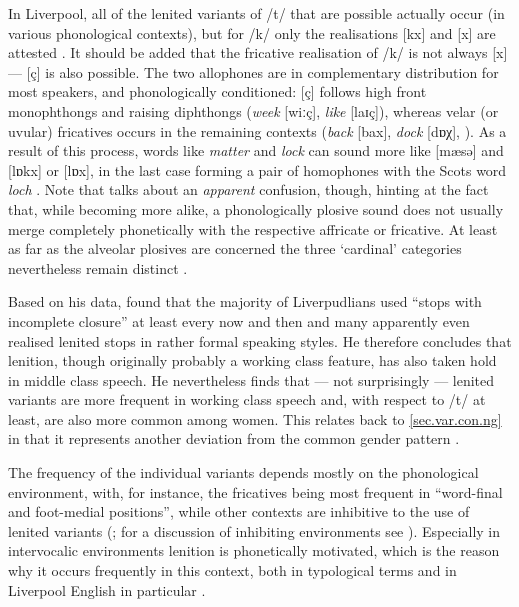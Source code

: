 In Liverpool, all of the lenited variants of /t/ that are possible actually occur (in various phonological contexts), but for /k/ only the realisations [kx] and [x] are attested \parencite[cf][242]{honeybone2001}.
It should be added that the fricative realisation of /k/ is not always [x] --- [ç] is also possible.
The two allophones are in complementary distribution for most speakers, and phonologically conditioned: [ç] follows high front monophthongs and raising diphthongs (\emph{week} [wiːç], \emph{like} [laɪç]), whereas velar (or uvular) fricatives occurs in the remaining contexts (\emph{back} [bax], \emph{dock} [dɒχ], \citealp[cf.][353]{watson2007}).
As a result of this process, words like \emph{matter} and \emph{lock} can sound more like [mæsə] and [lɒkx] or [lɒx], in the last case forming a pair of homophones with the Scots word \emph{loch} \citep[cf.][73]{trudgill1999}.
Note that \citeauthor{knowles1973} talks about an \emph{apparent} confusion, though, hinting at the fact that, while becoming more alike, a phonologically plosive sound does not usually merge completely phonetically with the respective affricate or fricative.
At least as far as the alveolar plosives are concerned the three `cardinal' categories nevertheless remain distinct \parencite[cf.][327 and 252--253]{knowles1973}.

Based on his \citeyear{knowles1973} data, \citeauthor{knowles1973} found that the majority of Liverpudlians used ``stops with incomplete closure'' at least every now and then and many apparently even realised lenited stops in rather formal speaking styles.
He therefore concludes that lenition, though originally probably a working class feature, has also taken hold in middle class speech.
He nevertheless finds that --- not surprisingly --- lenited variants are more frequent in working class speech and, with respect to /t/ at least, are also more common among women.
This relates back to \ref{sec.var.con.ng} in that it represents another deviation from the common gender pattern \citeyearpar[cf.][325--327]{knowles1973}.

The frequency of the individual variants depends mostly on the phonological environment, with, for instance, the fricatives being most frequent in ``word-final and foot-medial positions'', while other contexts are inhibitive to the use of lenited variants (\citealp[cf.][130]{honeybone2007}; for a discussion of inhibiting environments see \citealt{honeybone2001}).
Especially in intervocalic environments lenition is phonetically motivated, which is the reason why it occurs frequently in this context, both in typological terms and in Liverpool English in particular \parencite[cf][230 and 243]{honeybone2001}.

